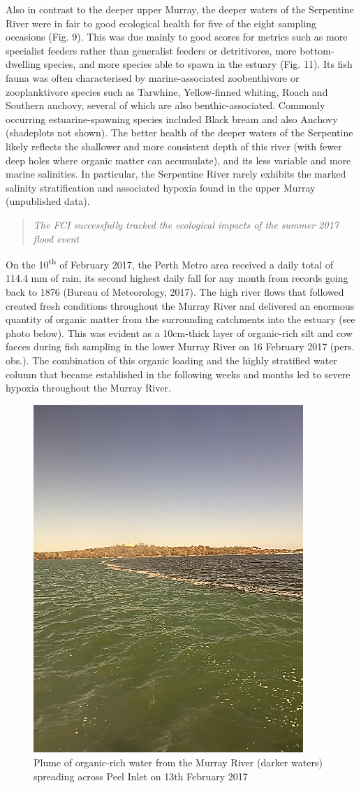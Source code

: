 \documentclass[
]{book}
\begin{document}
Also in contrast to the deeper upper Murray, the deeper waters of the Serpentine River were in fair to good ecological health for five of the eight sampling occasions (Fig. 9). This was due mainly to good scores for metrics such as more specialist feeders rather than generalist feeders or detritivores, more bottom-dwelling species, and more species able to spawn in the estuary (Fig. 11). Its fish fauna was often characterised by marine-associated zoobenthivore or zooplanktivore species such as Tarwhine, Yellow-finned whiting, Roach and Southern anchovy, several of which are also benthic-associated. Commonly occurring estuarine-spawning species included Black bream and also Anchovy (shadeplots not shown). The better health of the deeper waters of the Serpentine likely reflects the shallower and more consistent depth of this river (with fewer deep holes where organic matter can accumulate), and its less variable and more marine salinities. In particular, the Serpentine River rarely exhibits the marked salinity stratification and associated hypoxia found in the upper Murray (unpublished data).

\begin{quote}
\emph{The FCI successfully tracked the ecological impacts of the summer 2017 flood event}
\end{quote}

On the 10\textsuperscript{th} of February 2017, the Perth Metro area received a daily total of 114.4 mm of rain, its second highest daily fall for any month from records going back to 1876 (Bureau of Meteorology, 2017). The high river flows that followed created fresh conditions throughout the Murray River and delivered an enormous quantity of organic matter from the surrounding catchments into the estuary (see photo below). This was evident as a 10cm-thick layer of organic-rich silt and cow faeces during fish sampling in the lower Murray River on 16 February 2017 (pers. obs.). The combination of this organic loading and the highly stratified water column that became established in the following weeks and months led to severe hypoxia throughout the Murray River.~

\begin{figure}
\includegraphics[width=0.5\linewidth]{images/fish_ecology/picture11} \caption{Plume of organic-rich water from the Murray River (darker waters) spreading across Peel Inlet on 13th February 2017}\label{fig:fish-ecology-pic11}
\end{figure}
\end{document}
